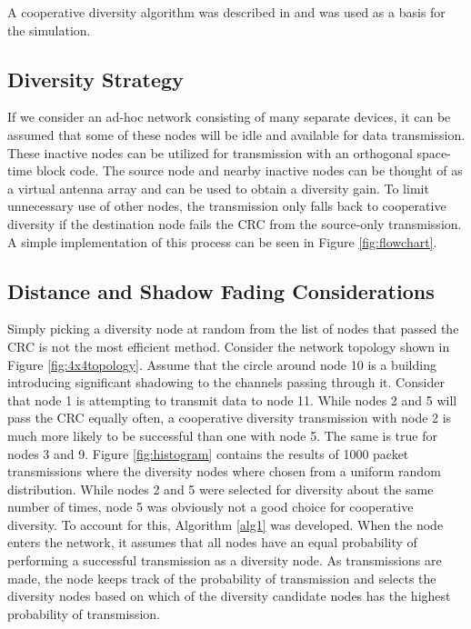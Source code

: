 A cooperative diversity algorithm was described in \cite{4686273} and was used as a basis for the simulation.

\subsection{Diversity Strategy}
If we consider an ad-hoc network consisting of many separate devices, it can be assumed that some of these nodes will be idle and available for data transmission.
These inactive nodes can be utilized for transmission with an orthogonal space-time block code.
The source node and nearby inactive nodes can be thought of as a virtual antenna array and can be used to obtain a diversity gain.
To limit unnecessary use of other nodes, the transmission only falls back to cooperative diversity if the destination node fails the CRC from the source-only transmission. A simple implementation of this process can be seen in Figure  \ref{fig:flowchart}.



\subsection{Distance and Shadow Fading Considerations}
Simply picking a diversity node at random from the list of nodes that passed the CRC is not the most efficient method.
Consider the network topology shown in Figure \ref{fig:4x4topology}.
Assume that the circle around node 10 is a building introducing significant shadowing to the channels passing through it.
Consider that node 1 is attempting to transmit data to node 11.
While nodes 2 and 5 will pass the CRC equally often,  a cooperative diversity transmission with node 2 is much more likely to be successful than one with node 5.
The same is true for nodes 3 and 9.
Figure \ref{fig:histogram} contains the results of 1000 packet transmissions where the diversity nodes where chosen from a uniform random distribution.
While nodes 2 and 5 were selected for diversity about the same number of times, node 5 was obviously not a good choice for cooperative diversity.
To account for this, Algorithm \ref{alg1} was developed.
When the node enters the network, it assumes that all nodes have an equal probability of performing a successful transmission as a diversity node.
As transmissions are made, the node keeps track of the probability of transmission and selects the diversity nodes based on which of the diversity candidate nodes has the highest probability of transmission.

